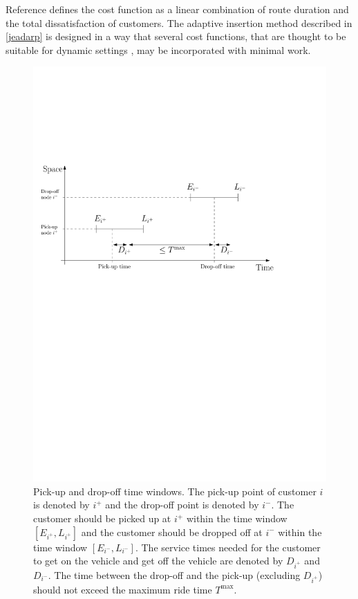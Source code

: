 \documentclass[dissertation,draft*]{aaltoseries}
\begin{document}
Reference \cite{psaraftis01} defines the cost function as a linear combination of route duration and the 
total dissatisfaction of customers. The adaptive insertion method described in \ref{jeadarp} is designed in a way 
that several cost functions, that are thought to be suitable for dynamic settings \cite{Hyytia2010}, may be incorporated with minimal work.

\begin{figure}[ht]
\begin{center}
\includegraphics[width=0.8 \columnwidth]{timeline01}
\caption{Pick-up and drop-off time windows. The pick-up point of
customer $i$ is denoted by $i^{+}$ and the drop-off point is denoted by $i^{-}$.
The customer should be picked up at $i^{+}$ within the time window $[E_{i^+},L_{i^+}]$
and the customer should be dropped off at $i^{-}$ within the time window $[E_{i^{-}},L_{i^{-}}]$.
The service times needed for the customer to get on the vehicle
and get off the vehicle are denoted by $D_{i^+}$ and $D_{i^-}$. The time between
the drop-off and the pick-up (excluding $D_{i^+}$) should not exceed the maximum ride time $T^{\max}$.
}
\label{timeline01}
\end{center}
\end{figure}
\end{document}
